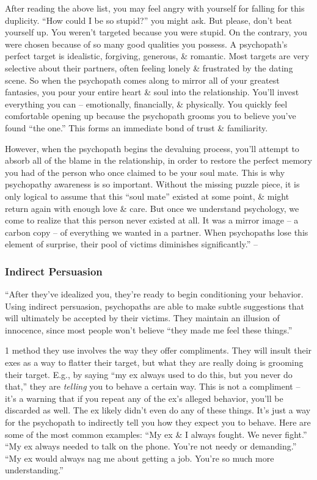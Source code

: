 \documentclass{article}
\numberwithin{equation}{section}
\begin{document}
After reading the above list, you may feel angry with yourself for falling for this duplicity. ``How could I be so stupid?'' you might ask. But please, don't beat yourself up. You weren't targeted because you were stupid. On the contrary, you were chosen because of so many good qualities you possess. A psychopath's perfect target is idealistic, forgiving, generous, \& romantic. Most targets are very selective about their partners, often feeling lonely \& frustrated by the dating scene. So when the psychopath comes along to mirror all of your greatest fantasies, you pour your entire heart \& soul into the relationship. You'll invest everything you can -- emotionally, financially, \& physically. You quickly feel comfortable opening up because the psychopath grooms you to believe you've found ``the one.'' This forms an immediate bond of trust \& familiarity.

However, when the psychopath begins the devaluing process, you'll attempt to absorb all of the blame in the relationship, in order to restore the perfect memory you had of the person who once claimed to be your soul mate. This is why psychopathy awareness is so important. Without the missing puzzle piece, it is only logical to assume that this ``soul mate'' existed at some point, \& might return again with enough love \& care. But once we understand psychology, we come to realize that this person never existed at all. It was a mirror image -- a carbon copy -- of everything we wanted in a partner. When psychopaths lose this element of surprise, their pool of victims diminishes significantly.'' -- \cite[pp. 24--29]{MacKenzie2015}

\subsubsection{Indirect Persuasion}
``After they've idealized you, they're ready to begin conditioning your behavior. Using indirect persuasion, psychopaths are able to make subtle suggestions that will ultimately be accepted by their victims. They maintain an illusion of innocence, since most people won't believe ``they made me feel these things.''

1 method they use involves the way they offer compliments. They will insult their exes as a way to flatter their target, but what they are really doing is grooming their target. E.g., by saying ``my ex always used to do this, but you never do that,'' they are \textit{telling} you to behave a certain way. This is not a compliment -- it's a warning that if you repeat any of the ex's alleged behavior, you'll be discarded as well. The ex likely didn't even do any of these things. It's just a way for the psychopath to indirectly tell you how they expect you to behave. Here are some of the most common examples: ``My ex \& I always fought. We never fight.'' ``My ex always needed to talk on the phone. You're not needy or demanding.'' ``My ex would always nag me about getting a job. You're so much more understanding.''
\end{document}
